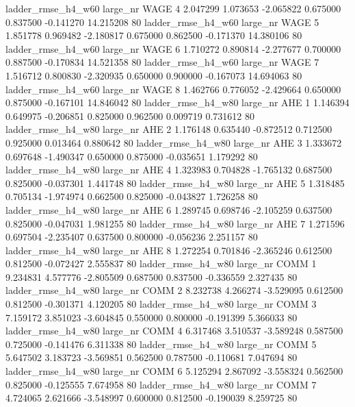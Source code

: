 ladder_rmse_h4_w60   large_nr     WAGE                 4  2.047299  1.073653  -2.065822 0.675000 0.837500 -0.141270   14.215208 80
 ladder_rmse_h4_w60   large_nr     WAGE                 5  1.851778  0.969482  -2.180817 0.675000 0.862500 -0.171370   14.380106 80
 ladder_rmse_h4_w60   large_nr     WAGE                 6  1.710272  0.890814  -2.277677 0.700000 0.887500 -0.170834   14.521358 80
 ladder_rmse_h4_w60   large_nr     WAGE                 7  1.516712  0.800830  -2.320935 0.650000 0.900000 -0.167073   14.694063 80
 ladder_rmse_h4_w60   large_nr     WAGE                 8  1.462766  0.776052  -2.429664 0.650000 0.875000 -0.167101   14.846042 80
 ladder_rmse_h4_w80   large_nr      AHE                 1  1.146394  0.649975  -0.206851 0.825000 0.962500  0.009719    0.731612 80
 ladder_rmse_h4_w80   large_nr      AHE                 2  1.176148  0.635440  -0.872512 0.712500 0.925000  0.013464    0.880642 80
 ladder_rmse_h4_w80   large_nr      AHE                 3  1.333672  0.697648  -1.490347 0.650000 0.875000 -0.035651    1.179292 80
 ladder_rmse_h4_w80   large_nr      AHE                 4  1.323983  0.704828  -1.765132 0.687500 0.825000 -0.037301    1.441748 80
 ladder_rmse_h4_w80   large_nr      AHE                 5  1.318485  0.705134  -1.974974 0.662500 0.825000 -0.043827    1.726258 80
 ladder_rmse_h4_w80   large_nr      AHE                 6  1.289745  0.698746  -2.105259 0.637500 0.825000 -0.047031    1.981255 80
 ladder_rmse_h4_w80   large_nr      AHE                 7  1.271596  0.697504  -2.235407 0.637500 0.800000 -0.056236    2.251157 80
 ladder_rmse_h4_w80   large_nr      AHE                 8  1.272254  0.701846  -2.365246 0.612500 0.812500 -0.072427    2.555837 80
 ladder_rmse_h4_w80   large_nr     COMM                 1  9.234831  4.577776  -2.805509 0.687500 0.837500 -0.336559    2.327435 80
 ladder_rmse_h4_w80   large_nr     COMM                 2  8.232738  4.266274  -3.529095 0.612500 0.812500 -0.301371    4.120205 80
 ladder_rmse_h4_w80   large_nr     COMM                 3  7.159172  3.851023  -3.604845 0.550000 0.800000 -0.191399    5.366033 80
 ladder_rmse_h4_w80   large_nr     COMM                 4  6.317468  3.510537  -3.589248 0.587500 0.725000 -0.141476    6.311338 80
 ladder_rmse_h4_w80   large_nr     COMM                 5  5.647502  3.183723  -3.569851 0.562500 0.787500 -0.110681    7.047694 80
 ladder_rmse_h4_w80   large_nr     COMM                 6  5.125294  2.867092  -3.558324 0.562500 0.825000 -0.125555    7.674958 80
 ladder_rmse_h4_w80   large_nr     COMM                 7  4.724065  2.621666  -3.548997 0.600000 0.812500 -0.190039    8.259725 80
